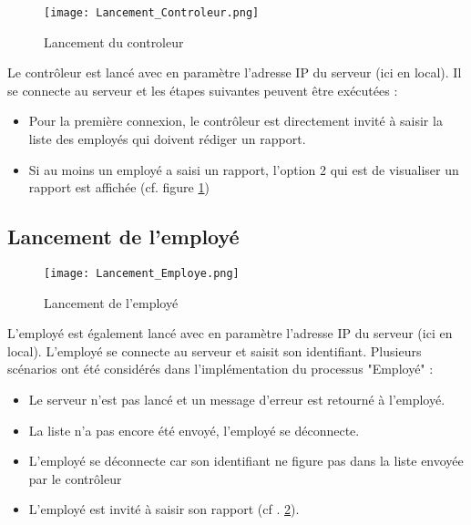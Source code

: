 \begin{center}
\begin{figure}[H] \centering
\texttt{[image: Lancement\_Controleur.png]}\\
\caption{\label{LancControleur} Lancement du controleur }
\end{figure}
\end{center}

Le contrôleur est lancé avec en paramètre l'adresse IP du serveur (ici en local). Il se connecte au serveur et les étapes suivantes  peuvent être exécutées : 


\begin{itemize}

\item	Pour la première connexion,  le contrôleur est directement invité à saisir la liste des employés qui doivent rédiger un rapport.
\item	Si au moins un employé a saisi un rapport, l'option 2 qui est de visualiser un rapport est affichée (cf. figure \ref{LancControleur})
\end{itemize}




\subsection{Lancement de l'employé}


\begin{center}
\begin{figure}[H] \centering
\texttt{[image: Lancement\_Employe.png]}\\
\caption{\label{LancEmploye} Lancement de l'employé}
\end{figure}
\end{center}

L'employé est également lancé avec en paramètre l'adresse IP du serveur (ici en local). L'employé  se connecte au serveur et saisit son identifiant.
Plusieurs scénarios ont été considérés dans l'implémentation du processus "Employé" : 

\begin{itemize}

\item Le serveur n'est pas lancé et un message d'erreur est retourné à l'employé.
\item La liste n'a pas encore été envoyé, l'employé se déconnecte.
\item L'employé se déconnecte car son identifiant ne figure pas dans la liste envoyée par le contrôleur
\item L'employé est invité à saisir son rapport (cf . \ref{LancEmploye}).

\end{itemize}





